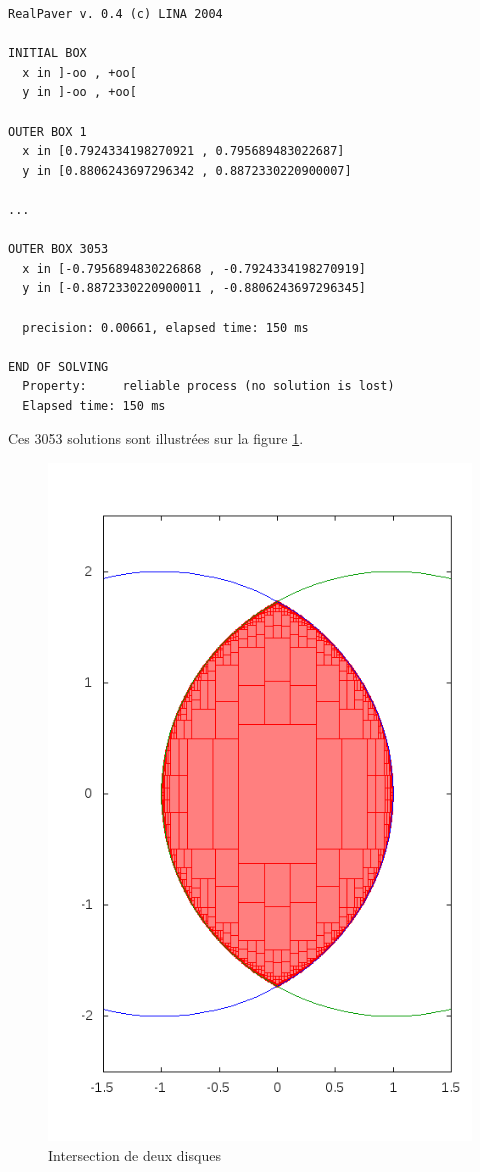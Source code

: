 \begin{verbatim}
RealPaver v. 0.4 (c) LINA 2004

INITIAL BOX
  x in ]-oo , +oo[
  y in ]-oo , +oo[

OUTER BOX 1
  x in [0.7924334198270921 , 0.795689483022687]
  y in [0.8806243697296342 , 0.8872330220900007]

...

OUTER BOX 3053
  x in [-0.7956894830226868 , -0.7924334198270919]
  y in [-0.8872330220900011 , -0.8806243697296345]

  precision: 0.00661, elapsed time: 150 ms

END OF SOLVING
  Property:     reliable process (no solution is lost)
  Elapsed time: 150 ms
\end{verbatim}
Ces 3053 solutions sont illustrées sur la figure \ref{fig:DisqueDisque}.
\begin{figure}[ht!] %
  \center
\includegraphics[scale=0.40]{img/disk-disk}
  \caption{Intersection de deux disques} %
 \label{fig:DisqueDisque} %
\end{figure} %
\clearpage
